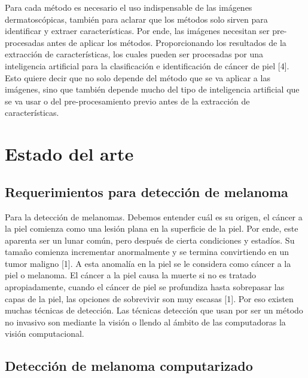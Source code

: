 \documentclass[a4paper]{article}
\begin{document}
Para cada método es necesario el uso indispensable de las imágenes dermatoscópicas, también para aclarar que los métodos solo sirven para identificar y extraer características. Por ende, las imágenes necesitan ser pre-procesadas antes de aplicar los métodos. Proporcionando los resultados de la extracción de características, los cuales pueden ser procesadas por una inteligencia artificial para la clasificación e identificación de cáncer de piel [4]. Esto quiere decir que no solo depende del método que se va aplicar a las imágenes, sino que también depende mucho del tipo de inteligencia artificial que se va usar o del pre-procesamiento previo antes de la extracción de características.


\section{Estado del arte}

\subsection{Requerimientos para detección de melanoma}

Para la detección de melanomas. Debemos entender cuál es su origen, el cáncer a la piel comienza como una lesión plana en la superficie de la piel. Por ende, este aparenta ser un lunar común, pero después de cierta condiciones y estadíos. Su tamaño comienza incrementar anormalmente y se termina convirtiendo en un tumor maligno [1]. A esta anomalía en la piel se le considera como cáncer a la piel o melanoma.
El cáncer a la piel causa la muerte si no es tratado apropiadamente, cuando el cáncer de piel se profundiza hasta sobrepasar las capas de la piel, las opciones de sobrevivir son muy escasas [1]. Por eso existen muchas técnicas de detección.
Las técnicas detección que usan por ser un método no invasivo son mediante la visión o llendo al ámbito de las computadoras la visión computacional. 



\subsection{Detección de melanoma computarizado}
\end{document}
